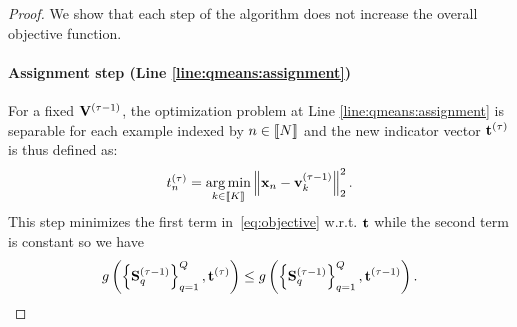 \begin{proof}
We show that each step of the algorithm does not increase the overall objective function. 

\paragraph{Assignment step (Line \ref{line:qmeans:assignment})} For a fixed ${\mathbf{V}}^{(\tau-1)}$, the optimization problem at Line \ref{line:qmeans:assignment} is separable for each example indexed by $n \in \left \llbracket N\right \rrbracket$ and the new indicator vector ${\mathbf{t}}^{(\tau)}$ is thus defined as:
%
\begin{align}
\label{eq:qmean_problem_U_fixed}
 t^{(\tau)}_n = \operatorname*{arg\,min}_{k \in \left \llbracket K\right \rrbracket} \left \| {\mathbf{x}}_n - {\mathbf{v}}_k^{(\tau-1)}\right \|_2^2.
\end{align}
%
This step minimizes the first term in~\eqref{eq:objective} w.r.t. ${\mathbf{t}}$ while the second term is constant so we have 
\begin{align*}
g\left (\left\{{\mathbf{S}}_q^{(\tau-1)}\right\}_{q=1}^{Q}, {\mathbf{t}}^{(\tau)}\right ) \leq g\left (\left\{{\mathbf{S}}_q^{(\tau-1)}\right\}_{q=1}^{Q}, {\mathbf{t}}^{(\tau-1)}\right ).
\end{align*}


\end{proof}
